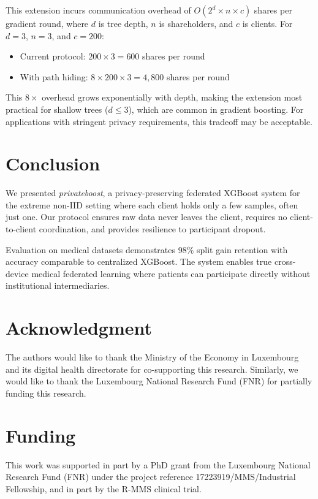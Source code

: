 \documentclass[journal,10pt]{IEEEtran}
\begin{document}
This extension incurs communication overhead of $O(2^d \times n \times c)$ shares per gradient round, where $d$ is tree depth, $n$ is shareholders, and $c$ is clients. For $d = 3$, $n = 3$, and $c = 200$:

\begin{itemize}
  \item Current protocol: $200 \times 3 = 600$ shares per round
  \item With path hiding: $8 \times 200 \times 3 = 4{,}800$ shares per round
\end{itemize}

This $8\times$ overhead grows exponentially with depth, making the extension most practical for shallow trees ($d \leq 3$), which are common in gradient boosting. For applications with stringent privacy requirements, this tradeoff may be acceptable.

\section{Conclusion}

We presented \textit{privateboost}, a privacy-preserving federated XGBoost system for the extreme non-IID setting where each client holds only a few samples, often just one. Our protocol ensures raw data never leaves the client, requires no client-to-client coordination, and provides resilience to participant dropout.

Evaluation on medical datasets demonstrates 98\% split gain retention with accuracy comparable to centralized XGBoost. The system enables true cross-device medical federated learning where patients can participate directly without institutional intermediaries.

\section*{Acknowledgment}
The authors would like to thank the Ministry of the Economy in Luxembourg and its digital health directorate for co-supporting this research. Similarly, we would like to thank the Luxembourg National Research Fund (FNR) for partially funding this research.

\section*{Funding}
This work was supported in part by a PhD grant from the Luxembourg National Research Fund (FNR) under the project reference 17223919/MMS/Industrial Fellowship, and in part by the R-MMS clinical trial.



\end{document}
